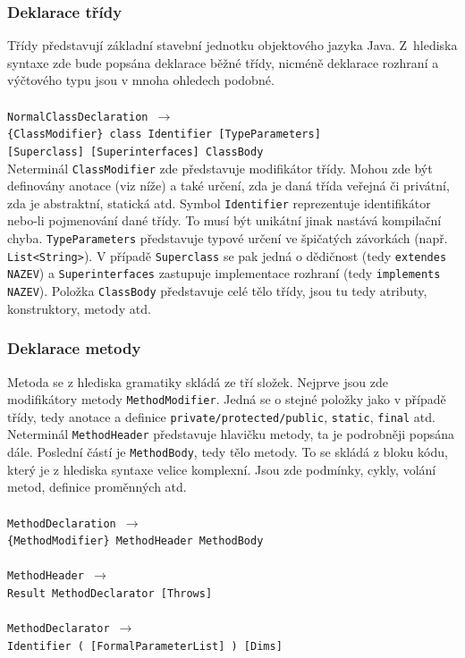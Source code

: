 			\subsubsection{Deklarace třídy}
				Třídy představují základní stavební jednotku objektového jazyka Java. Z~hlediska syntaxe zde bude popsána deklarace běžné třídy, nicméně deklarace rozhraní a výčtového typu jsou v mnoha ohledech podobné.\\\\
				\- \- \- \- \- \- \texttt{NormalClassDeclaration $\rightarrow$}\\
				\- \- \- \- \- \- \- \- \- \- \- \- \texttt{\{ClassModifier\} \textcolor{pblue}{class} Identifier [TypeParameters]}\\  	 
				\- \- \- \- \- \- \- \- \- \- \- \- \texttt{[Superclass] [Superinterfaces] ClassBody}\\
	
				Neterminál \texttt{ClassModifier} zde představuje modifikátor třídy. Mohou zde být definovány anotace (viz níže) a také určení, zda je daná třída veřejná či privátní, zda je abstraktní, statická atd. Symbol \texttt{Identifier} reprezentuje identifikátor nebo-li pojmenování dané třídy. To musí být unikátní jinak nastává kompilační chyba. \texttt{TypeParameters} představuje typové určení ve špičatých závorkách (např. \texttt{List<String>}). V případě \texttt{Superclass} se pak jedná o dědičnost (tedy \texttt{extendes NAZEV}) a \texttt{Superinterfaces} zastupuje implementace rozhraní (tedy \texttt{implements NAZEV}). Položka \texttt{ClassBody} představuje celé tělo třídy, jsou tu tedy atributy, konstruktory, metody atd.	 
		 
			\subsubsection{Deklarace metody}
				Metoda se z hlediska gramatiky skládá ze tří složek. Nejprve jsou zde modifikátory metody \texttt{MethodModifier}. Jedná se o stejné položky jako v případě třídy, tedy anotace a definice \texttt{private/protected/public}, \texttt{static}, \texttt{final} atd. Neterminál \texttt{MethodHeader} představuje hlavičku metody, ta je podrobněji popsána dále. Poslední částí je \texttt{MethodBody}, tedy tělo metody. To se skládá z bloku kódu, který je z hlediska syntaxe velice komplexní. Jsou zde podmínky, cykly, volání metod, definice proměnných atd.\\\\
				\- \- \- \- \- \- \texttt{MethodDeclaration $\rightarrow$}\\
				\- \- \- \- \- \- \- \- \- \- \- \- \texttt{\{MethodModifier\} MethodHeader MethodBody}\\\\
 				\- \- \- \- \- \- \texttt{MethodHeader $\rightarrow$}\\
				\- \- \- \- \- \- \- \- \- \- \- \- \texttt{Result MethodDeclarator [Throws]}\\\\
				\- \- \- \- \- \- \texttt{MethodDeclarator $\rightarrow$}\\
				\- \- \- \- \- \- \- \- \- \- \- \- \texttt{Identifier ( [FormalParameterList] ) [Dims]}\\

